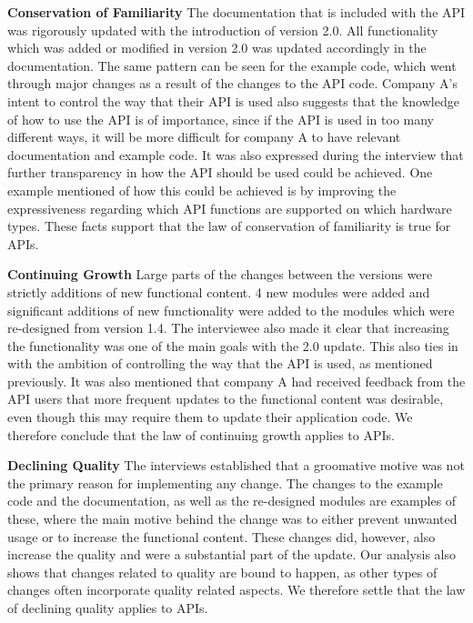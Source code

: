 \documentclass{sig-alternate}
\begin{document}
\smallskip \noindent
\textbf{Conservation of Familiarity  } 
The documentation that is included with the API was rigorously updated with the introduction of version 2.0. All functionality which was added or modified in version 2.0 was updated accordingly in the documentation. The same pattern can be seen for the example code, which went through major changes as a result of the changes to the API code. Company A's intent to control the way that their API is used also suggests that the knowledge of how to use the API is of importance, since if the API is used in too many different ways, it will be more difficult for company A to have relevant documentation and example code. It was also expressed during the interview that further transparency in how the API should be used could be achieved. One example mentioned of how this could be achieved is by improving the expressiveness regarding which API functions are supported on which hardware types. These facts support that the law of conservation of familiarity is true for APIs. 

\smallskip \noindent
\textbf{Continuing Growth  } 
Large parts of the changes between the versions were strictly additions of new functional content. 4 new modules were added and significant additions of new functionality were added to the modules which were re-designed from version 1.4. The interviewee also made it clear that increasing the functionality was one of the main goals with the 2.0 update. This also ties in with the ambition of controlling the way that the API is used, as mentioned previously. It was also mentioned that company A had received feedback from the API users that more frequent updates to the functional content was desirable, even though this may require them to update their application code. We therefore conclude that the law of continuing growth applies to APIs. 

\smallskip \noindent
\textbf{Declining Quality  } 
The interviews established that a groomative motive was not the primary reason for implementing any change. The changes to the example code and the documentation, as well as the re-designed modules are examples of these, where the main motive behind the change was to either prevent unwanted usage or to increase the functional content. These changes did, however, also increase the quality and were a substantial part of the update. Our analysis also shows that changes related to quality are bound to happen, as other types of changes often incorporate quality related aspects. We therefore settle that the law of declining quality applies to APIs. 
\end{document}
